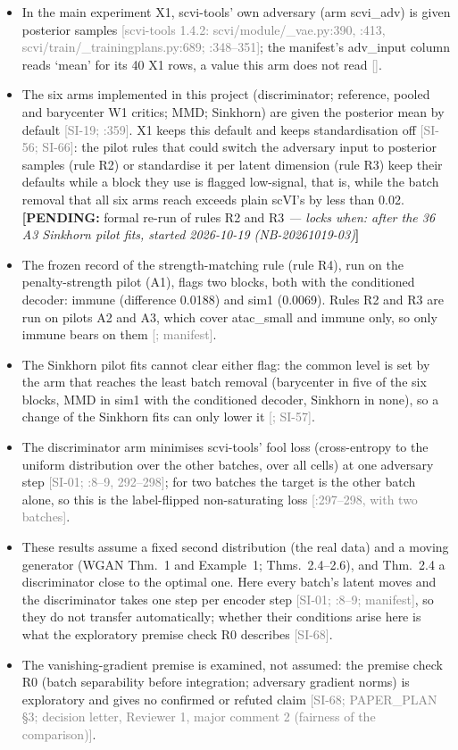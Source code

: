 \documentclass[11pt]{article}
\newcommand{\src}[1]{{\scriptsize\textcolor{gray}{[#1]}}}
\newcommand{\pending}[2]{{\color{BurntOrange}\textbf{[PENDING:} #1 \textit{--- locks when: #2}\textbf{]}}}
\begin{document}
\begin{itemize}
\item In the main experiment X1, scvi-tools' own adversary (arm scvi\_adv) is given posterior samples \src{scvi-tools 1.4.2: scvi/module/\_vae.py:390, :413, scvi/train/\_trainingplans.py:689; \file{scvi_adversarial_plan.py}:348--351}; the manifest's adv\_input column reads `mean' for its 40 X1 rows, a value this arm does not read \src{}.
\item The six arms implemented in this project (discriminator; reference, pooled and barycenter W1 critics; MMD; Sinkhorn) are given the posterior mean by default \src{SI-19; :359}. X1 keeps this default and keeps standardisation off \src{SI-56; SI-66}: the pilot rules that could switch the adversary input to posterior samples (rule R2) or standardise it per latent dimension (rule R3) keep their defaults while a block they use is flagged low-signal, that is, while the batch removal that all six arms reach exceeds plain scVI's by less than 0.02. \pending{formal re-run of rules R2 and R3}{after the 36 A3 Sinkhorn pilot fits, started 2026-10-19 (NB-20261019-03)}
\item The frozen record of the strength-matching rule (rule R4), run on the penalty-strength pilot (A1), flags two blocks, both with the conditioned decoder: immune (difference 0.0188) and sim1 (0.0069). Rules R2 and R3 are run on pilots A2 and A3, which cover atac\_small and immune only, so only immune bears on them \src{; manifest}.
\item The Sinkhorn pilot fits cannot clear either flag: the common level is set by the arm that reaches the least batch removal (barycenter in five of the six blocks, MMD in sim1 with the conditioned decoder, Sinkhorn in none), so a change of the Sinkhorn fits can only lower it \src{; SI-57}.
\item The discriminator arm minimises scvi-tools' fool loss (cross-entropy to the uniform distribution over the other batches, over all cells) at one adversary step \src{SI-01; :8--9, 292--298}; for two batches the target is the other batch alone, so this is the label-flipped non-saturating loss \src{:297--298, with two batches}.
\item These results assume a fixed second distribution (the real data) and a moving generator (WGAN Thm.~1 and Example~1; Thms.~2.4--2.6), and Thm.~2.4 a discriminator close to the optimal one. Here every batch's latent moves and the discriminator takes one step per encoder step \src{SI-01; :8--9; manifest}, so they do not transfer automatically; whether their conditions arise here is what the exploratory premise check R0 describes \src{SI-68}.
\item The vanishing-gradient premise is examined, not assumed: the premise check R0 (batch separability before integration; adversary gradient norms) is exploratory and gives no confirmed or refuted claim \src{SI-68; PAPER\_PLAN \S3; decision letter, Reviewer 1, major comment 2 (fairness of the comparison)}.
\end{itemize}
\end{document}
